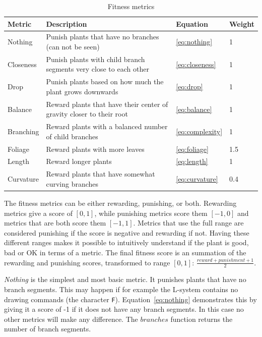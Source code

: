 \begin{table}
    \centering
    \begin{tabularx}{\textwidth}{| l | X | l | l |}
    \hline
    \textbf{Metric} & \textbf{Description} & \textbf{Equation} & \textbf{Weight} \\
    \hline
    Nothing & Punish plants that have no branches (can not be seen) & \ref{eq:nothing} & 1 \\
    \hline
    Closeness & Punish plants with child \glspl{branch segment} very close to each other & \ref{eq:closeness} & 1 \\
    \hline
    Drop & Punish plants based on how much the plant grows downwards & \ref{eq:drop} & 1 \\
    \hline
    Balance & Reward plants that have their center of gravity closer to their root & \ref{eq:balance} & 1 \\
    \hline
    Branching & Reward plants with a balanced number of child branches & \ref{eq:complexity} & 1 \\
    \hline
    Foliage & Reward plants with more leaves & \ref{eq:foliage} & 1.5 \\
    \hline
    Length & Reward longer plants & \ref{eq:length} & 1 \\
    \hline
    Curvature & Reward plants that have somewhat curving branches & \ref{eq:curvature} & 0.4 \\
    \hline
    \end{tabularx}
    \caption{Fitness metrics}
    \label{tab:fitness}
\end{table}

The fitness metrics can be either rewarding, punishing, or both.
Rewarding metrics give a score of $[0,1]$, while punishing metrics score them $[-1,0]$ and metrics that are both score them $[-1,1]$.
Metrics that use the full range are considered punishing if the score is negative and rewarding if not.
Having these different ranges makes it possible to intuitively understand if the plant is good, bad or OK in terms of a metric.
The final fitness score is an summation of the rewarding and punishing scores, transformed to range $[0,1]$: $\frac{reward + punishment + 1}{2}$.

\textit{Nothing} is the simplest and most basic metric.
It punishes plants that have no \glspl{branch segment}.
This may happen if for example the \gls{L-system} contains no drawing commands (the character \texttt{F}).
Equation~\ref{eq:nothing} demonstrates this by giving it a score of -1 if it does not have any \glspl{branch segment}.
In this case no other metrics will make any difference.
The $branches$ function returns the number of \glspl{branch segment}.

